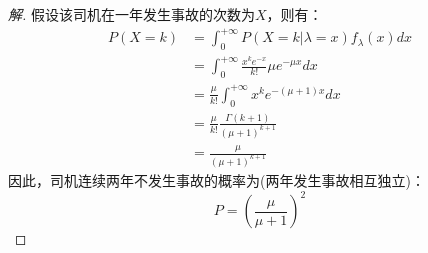 \documentclass[12pt]{article}
\begin{document}
\begin{enumerate}
\begin{proof}[解]
	假设该司机在一年发生事故的次数为$X$，则有：
	\begin{equation}
	\begin{aligned}
	P(X=k)&=\int_{0}^{+\infty}P(X=k|\lambda=x)f_{\lambda}(x)dx \\
	&=\int_{0}^{+\infty}\frac{x^ke^{-x}}{k!}\mu e^{-\mu x}dx \\
	&=\frac{\mu}{k!}\int_{0}^{+\infty}x^ke^{-(\mu+1)x}dx \\
	&=\frac{\mu}{k!}\frac{\Gamma(k+1)}{(\mu+1)^{k+1}} \\
	&=\frac{\mu}{(\mu+1)^{k+1}}
	\end{aligned}
	\end{equation}
	因此，司机连续两年不发生事故的概率为(两年发生事故相互独立)：
	\begin{equation}
	P=\left(\frac{\mu}{\mu+1}\right)^2
	\end{equation}
\end{proof}


\end{enumerate}
\end{document}
